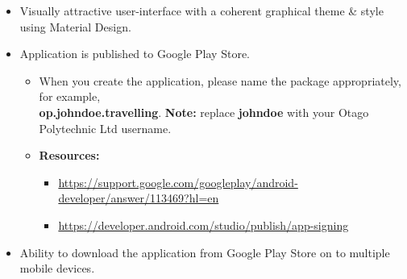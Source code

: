 \documentclass{article}
\begin{document}
\begin{itemize}
\begin{itemize}
    \end{itemize}
    \item Visually attractive user-interface with a coherent graphical theme \& style using Material Design.
    \item Application is published to Google Play Store.
    \begin{itemize}
        \item When you create the application, please name the package appropriately, for example, \\ \textbf{op.johndoe.travelling}. \textbf{Note:} replace \textbf{johndoe} with your Otago Polytechnic Ltd username.
        \item \textbf{Resources:}
        \begin{itemize}
            \item \footnotesize\href{https://support.google.com/googleplay/android-developer/answer/113469?hl=en}{https://support.google.com/googleplay/android-developer/answer/113469?hl=en}
            \item \footnotesize\href{https://developer.android.com/studio/publish/app-signing}{https://developer.android.com/studio/publish/app-signing}
        \end{itemize}
    \end{itemize}
    \item Ability to download the application from Google Play Store on to multiple mobile devices.
\end{itemize}
\end{document}
